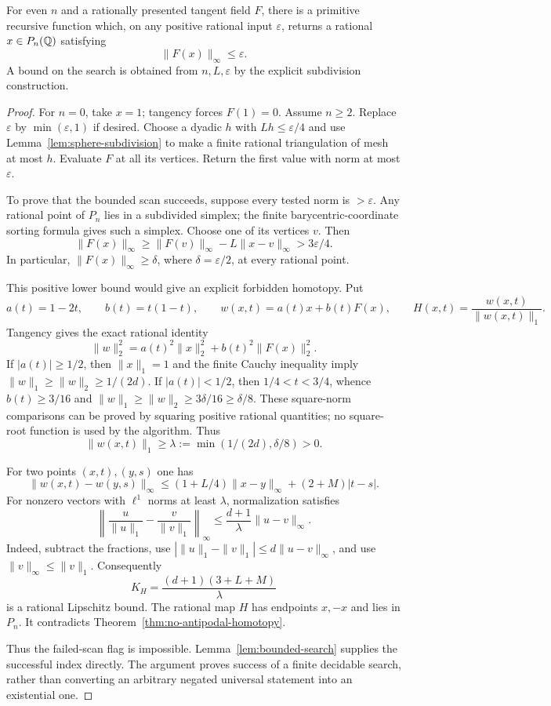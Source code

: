 \begin{theorem}\label{thm:approx-hairy}
For even $n$ and a rationally presented tangent field $F$, there is a primitive recursive function which, on any positive rational input $\varepsilon$, returns a rational $x\in P_n(\mathbb Q)$ satisfying
\[
 \|F(x)\|_\infty\leq\varepsilon.
\]
A bound on the search is obtained from $n,L,\varepsilon$ by the explicit subdivision construction.
\end{theorem}
\begin{proof}
For $n=0$, take $x=1$; tangency forces $F(1)=0$. Assume $n\geq2$. Replace $\varepsilon$ by $\min(\varepsilon,1)$ if desired. Choose a dyadic $h$ with $Lh\leq\varepsilon/4$ and use Lemma~\ref{lem:sphere-subdivision} to make a finite rational triangulation of mesh at most $h$. Evaluate $F$ at all its vertices. Return the first value with norm at most $\varepsilon$.

To prove that the bounded scan succeeds, suppose every tested norm is $>\varepsilon$. Any rational point of $P_n$ lies in a subdivided simplex; the finite barycentric-coordinate sorting formula gives such a simplex. Choose one of its vertices $v$. Then
\[
 \|F(x)\|_\infty
 \geq\|F(v)\|_\infty-L\|x-v\|_\infty
 >3\varepsilon/4.
\]
In particular, $\|F(x)\|_\infty\geq\delta$, where $\delta=\varepsilon/2$, at every rational point.

This positive lower bound would give an explicit forbidden homotopy. Put
\[
 a(t)=1-2t,\qquad b(t)=t(1-t),\qquad
 w(x,t)=a(t)x+b(t)F(x),\qquad
 H(x,t)=\frac{w(x,t)}{\|w(x,t)\|_1}.
\]
Tangency gives the exact rational identity
\[
 \|w\|_2^2=a(t)^2\|x\|_2^2+b(t)^2\|F(x)\|_2^2.
\]
If $|a(t)|\geq1/2$, then $\|x\|_1=1$ and the finite Cauchy inequality imply
$\|w\|_1\geq\|w\|_2\geq1/(2d)$.
If $|a(t)|<1/2$, then $1/4<t<3/4$, whence $b(t)\geq3/16$ and
$\|w\|_1\geq\|w\|_2\geq3\delta/16\geq\delta/8$.
These square-norm comparisons can be proved by squaring positive rational quantities; no square-root function is used by the algorithm. Thus
\[
 \|w(x,t)\|_1\geq
 \lambda:=\min(1/(2d),\delta/8)>0.
\]

For two points $(x,t),(y,s)$ one has
\[
 \|w(x,t)-w(y,s)\|_\infty
 \leq(1+L/4)\|x-y\|_\infty+(2+M)|t-s|.
\]
For nonzero vectors with $\ell^1$ norms at least $\lambda$, normalization satisfies
\[
 \left\|\frac u{\|u\|_1}-\frac v{\|v\|_1}\right\|_\infty
 \leq \frac{d+1}{\lambda}\|u-v\|_\infty.
\]
Indeed, subtract the fractions, use
$|\|u\|_1-\|v\|_1|\leq d\|u-v\|_\infty$, and use
$\|v\|_\infty\leq\|v\|_1$.
Consequently
\[
 K_H=\frac{(d+1)(3+L+M)}{\lambda}
\]
is a rational Lipschitz bound. The rational map $H$ has endpoints $x,-x$ and lies in $P_n$. It contradicts Theorem~\ref{thm:no-antipodal-homotopy}.

Thus the failed-scan flag is impossible. Lemma~\ref{lem:bounded-search} supplies the successful index directly. The argument proves success of a finite decidable search, rather than converting an arbitrary negated universal statement into an existential one.
\end{proof}

